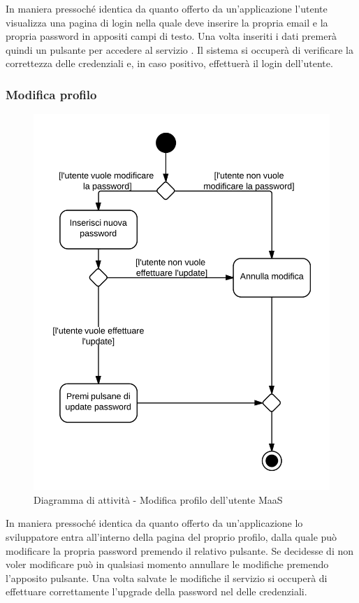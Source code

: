 In maniera pressoché identica da quanto offerto da un'applicazione  l'utente visualizza una pagina di login nella quale deve inserire la propria email e la propria password in appositi campi di testo. Una volta inseriti i dati premerà quindi un pulsante per accedere al servizio . Il sistema si occuperà di verificare la correttezza delle credenziali e, in caso positivo, effettuerà il login dell'utente.

\subsubsection{Modifica profilo}

\begin{figure}[H]
\centering
\includegraphics[scale=0.1]{uml/MaaP - Modifica profilo.png}
\caption{Diagramma di attività - Modifica profilo dell'utente MaaS}
\end{figure}

In maniera pressoché identica da quanto offerto da un'applicazione  lo sviluppatore entra all'interno della pagina del proprio profilo, dalla quale può modificare la propria password premendo il relativo pulsante. Se decidesse di non voler modificare può in qualsiasi momento annullare le modifiche premendo l'apposito pulsante. Una volta salvate le modifiche il servizio  si occuperà di effettuare correttamente l'upgrade della password nel  delle credenziali.

